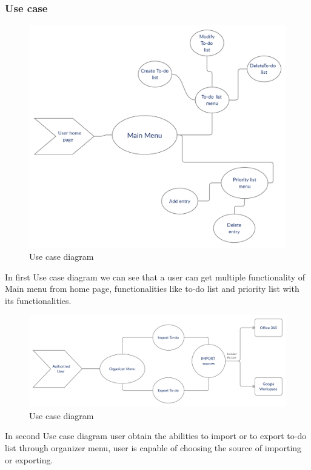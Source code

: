 \subsubsection{Use case}
\par
\begin{figure}[h]
	\includegraphics[width=\textwidth]{diagramusecase1}
	\caption{Use case diagram}
\end{figure}
\par In first Use case diagram we can see that a user can get multiple functionality of Main menu from home page, functionalities like to-do list and priority list with its functionalities.

\par
\begin{figure}[h]
	\includegraphics[width=\textwidth]{diagramusecase2}
	\caption{Use case diagram}
\end{figure}
\par In second Use case diagram user obtain the abilities to import or to export to-do list through organizer menu, user is capable of choosing the source of importing or exporting.
